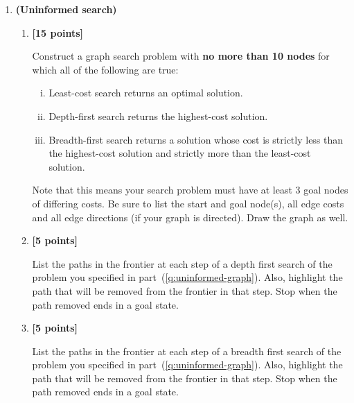 \documentclass{article}
\newcounter{totalpoints}
\newcommand{\points}[1]{{\addtocounter{totalpoints}{#1}\textbf{[#1 points]}}}
\begin{document}
\pagestyle{myheadings}

\clearpage
\begin{enumerate}

\item \textbf{(Uninformed search)}
\begin{enumerate}
\item \points{15} \label{q:uninformed-graph}
Construct a graph search problem with \textbf{no more than 10 nodes} for which all of the following are true:
\begin{enumerate}[i.]
    \item Least-cost search returns an optimal solution.
    \item Depth-first search returns the highest-cost solution.
    \item Breadth-first search returns a solution whose cost is strictly less than the highest-cost solution and strictly more than the least-cost solution.
\end{enumerate}
Note that this means your search problem must have at least 3 goal nodes of differing costs.
Be sure to list the start and goal node(s), all edge costs and all edge directions (if your graph is directed). Draw the graph as well.

\begin{answer}{2.5in}
\end{answer}


\item \points{5}
List the paths in the frontier at each step of a depth first search of the problem you specified in part~(\ref{q:uninformed-graph}). Also, highlight the path that will be removed from the frontier in that step. Stop when the path removed ends in a goal state.

\begin{answer}{1in}
\end{answer}

\item \points{5}
List the paths in the frontier at each step of a breadth first search of the problem you specified in part~(\ref{q:uninformed-graph}). Also, highlight the path that will be removed from the frontier in that step. Stop when the path removed ends in a goal state.

\begin{answer}{1in}
\end{answer}


\end{enumerate}
\end{enumerate}
\end{document}
